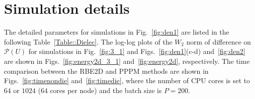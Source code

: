
\section{Simulation details}
The detailed parameters for simulations in Fig.~\ref{fig:den1} are listed in the following Table~\ref{Table::Dielec}.  {The log-log plots of the $W_2$ norm of difference on $\mathscr{P}(U)$ for simulations in Fig.~\ref{fig:3_1} and Figs.~\ref{fig:den1}(c-d) and~\ref{fig:den2} are shown in Figs.~\ref{fig:energy2d_3_1} and~\ref{fig:energy2d}, respectively.}
 {The time comparison between the RBE2D and PPPM methods are shown in Figs.~\ref{fig:timenondie} and~\ref{fig:timedie}, where the number of CPU cores is set to $64$ or $1024$ ($64$ cores per node) and the batch size is $P=200$.}

